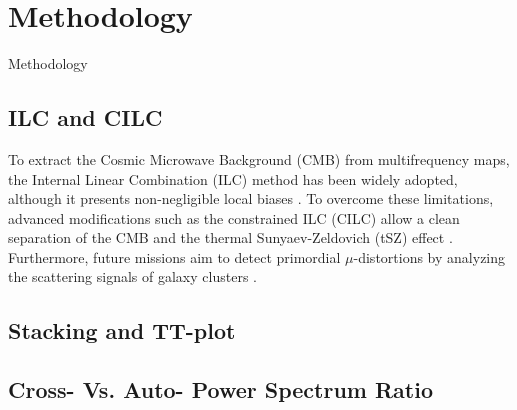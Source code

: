 
\chapter{Methodology} \label{sec:methodology}


Methodology

\section{ILC and CILC}
To extract the Cosmic Microwave Background (CMB) from multifrequency maps, the Internal Linear Combination (ILC) method has been widely adopted,
although it presents non-negligible local biases \cite{Eriksen2004_ILC}. To overcome these limitations,
advanced modifications such as the constrained ILC (CILC) allow a clean separation of the CMB and the thermal Sunyaev-Zeldovich (tSZ) effect \cite{Remazeilles2011_CILC}.
Furthermore, future missions aim to detect primordial $\mu$-distortions by analyzing the scattering signals of galaxy clusters \cite{Zegeye2024_mu_distortion}.



\section{Stacking and TT-plot}




\section{Cross- Vs. Auto- Power Spectrum Ratio}



